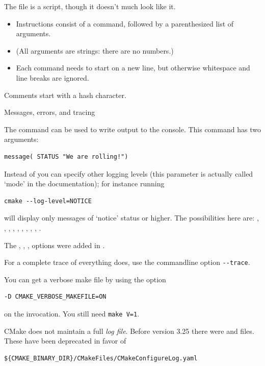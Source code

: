 The  file is a script,
though it doesn't much look like it.
\begin{itemize}
\item
  Instructions consist of a command, followed by a parenthesized
  list of arguments.
\item
  (All arguments are strings: there are no numbers.)
\item
  Each command needs to start on a new line, but otherwise
  whitespace and line breaks are ignored.
\end{itemize}

Comments start with a hash character.

 {Messages, errors, and tracing}

The  command can be used to write output
to the console. This command has two arguments:
\begin{lstlisting}
message( STATUS "We are rolling!")
\end{lstlisting}
Instead of  you can specify other logging levels
(this parameter is actually called `mode' in the documentation);
for instance running 
\begin{lstlisting}[language=shell]
cmake --log-level=NOTICE
\end{lstlisting}
will display only messages of `notice' status or higher.
%
The possibilities here are: , ,
, , , ,
, , , .

The , , ,  options
were added in .

For a complete trace of everything  does, use
the commandline option \lstinline[language=shell]{--trace}.

You can get a verbose make file by using the option
\begin{lstlisting}[language=shell]
-D CMAKE_VERBOSE_MAKEFILE=ON
\end{lstlisting}
on the  invocation. You still need \lstinline[language=shell]{make V=1}.

CMake does not maintain a full \emph{log file}.
Before version 3.25 there were  and  files.
These have been deprecated in favor of
\begin{lstlisting}
${CMAKE_BINARY_DIR}/CMakeFiles/CMakeConfigureLog.yaml
\end{lstlisting}

